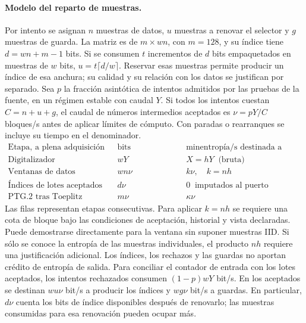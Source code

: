 \paragraph{Modelo del reparto de muestras.}
Por intento se asignan \(n\) muestras de datos, \(u\) muestras a renovar el
selector y \(g\) muestras de guarda. La matriz es de
\(m\times wn\), con \(m=128\), y su índice tiene \(d=wn+m-1\) bits.
Si se consumen \(t\) incrementos de \(d\) bits empaquetados en muestras
de \(w\) bits, \(u=t\lceil d/w\rceil\). Reservar esas muestras permite
producir un índice de esa anchura; su calidad y su relación con los datos
se justifican por separado. Sea \(p\) la fracción asintótica de intentos
admitidos por las pruebas de la fuente, en un régimen estable con caudal
\(Y\). Si todos los intentos cuestan \(C=n+u+g\), el caudal de números
intermedios aceptados es \(\nu=pY/C\) bloques/s antes de aplicar límites de
cómputo. Con paradas o rearranques se incluye su tiempo en el denominador.
\[
\begin{array}{lcc}
\text{Etapa, a plena adquisición} & \text{bits producidos/s}
   & \text{minentropía/s destinada a datos}\\
\hline
\text{Digitalizador} & wY & X=hY\ \text{ (bruta)}\\
\text{Ventanas de datos aceptadas} & wn\nu & k\nu,\quad k=nh\\
\text{Índices de lotes aceptados} & d\nu & 0\ \text{ imputados al puerto}\\
\text{PTG.2 tras Toeplitz} & m\nu & \kappa\nu
\end{array}
\]
Las filas representan etapas consecutivas. Para aplicar \(k=nh\) se requiere
una cota de bloque bajo las condiciones de aceptación, historial y vista
declaradas. Puede demostrarse directamente para la ventana sin suponer
muestras IID. Si sólo se conoce la entropía de las muestras individuales,
el producto \(nh\) requiere una justificación adicional. Los índices, los
rechazos y las guardas no aportan crédito de entropía de salida.
Para conciliar el contador de entrada con los lotes aceptados, los intentos
rechazados consumen \((1-p)wY\) bit/s. En los aceptados se destinan
\(wu\nu\) bit/s a producir los índices y \(wg\nu\) bit/s a guardas.
En particular, \(d\nu\) cuenta los bits de índice disponibles después de
renovarlo; las muestras consumidas para esa renovación pueden ocupar más.

